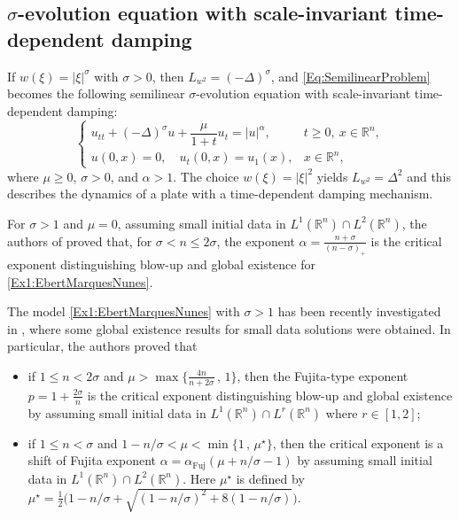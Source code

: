 \documentclass[10pt]{article}
\newcommand{\<}{\langle}
\renewcommand{\>}{\rangle}
\numberwithin{equation}{section}
\begin{document}
\subsection{$\sigma$-evolution equation with scale-invariant time-dependent damping} \label{Sect:sigma-evol}
If $w(\xi) = |\xi|^\sigma$ with $\sigma > 0$, then $L_{w^2} = (-\Delta)^\sigma$, and \eqref{Eq:SemilinearProblem} becomes the following semilinear $\sigma$-evolution equation with scale-invariant time-dependent damping:
    \begin{equation}\label{Ex1:EbertMarquesNunes}
    \begin{cases}
    u_{tt} + (-\Delta)^\sigma u + \dfrac{\mu}{1+t} u_t = |u|^\alpha, & t \geq 0, \ x \in \mathbb{R}^n, \\
    u(0,x) = 0, \quad u_t(0,x) = u_1(x), & x \in \mathbb{R}^n,
    \end{cases}
    \end{equation}
where $\mu \geq 0$, $\sigma > 0$, and $\alpha > 1$. The choice $w(\xi) = |\xi|^2$ yields $L_{w^2} = \Delta^2$ and this describes the dynamics of a plate with a time-dependent damping mechanism.

For $\sigma>1$ and $\mu=0$, assuming small initial data in $L^1(\mathbb{R}^n)\cap L^2(\mathbb{R}^n)$, the authors of \cite{Ebert-L} proved that, for $\sigma<n\leq 2\sigma$, the exponent $\alpha=\frac{n+\sigma}{(n-\sigma)_+}$ is the critical exponent distinguishing blow-up and global existence for \eqref{Ex1:EbertMarquesNunes}.

The model \eqref{Ex1:EbertMarquesNunes} with $\sigma>1$ has been recently investigated in \cite{Ebert-Marques-Nunes=2024}, where some global existence results for small data solutions were obtained.  In particular, the authors proved that
\begin{itemize}
\item if $1\leq n<2\sigma$ and  $\mu>\max\{\frac{4n}{n+2\sigma}\,,\,1 \}$, then the Fujita-type exponent $p=1+\frac{2\sigma}{n}$ is the critical exponent distinguishing blow-up and global existence by assuming small initial data in $L^1(\mathbb{R}^n)\cap L^r(\mathbb{R}^n)$ where $r\in[1,2]$;
\item if $1\leq n<\sigma$ and $1-n/\sigma<\mu<\min\{1\,,\,\mu^{\star}\}$, then the critical exponent is a shift of Fujita exponent $\alpha=\alpha_{\text{Fuj}}(\mu+n/\sigma-1)$ by assuming small initial data in $L^1(\mathbb{R}^n)\cap L^2(\mathbb{R}^n)$. Here $\mu^{\star}$ is defined by $\mu^\star = \frac{1}{2}\big( 1-n/\sigma +\sqrt{(1-n/\sigma)^2+8(1-n/\sigma)} \big)$.
\end{itemize}
\end{document}
